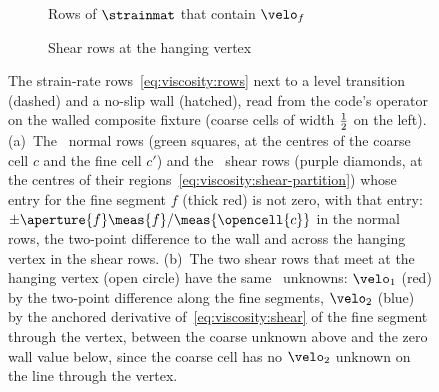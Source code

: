 \begin{figure}
\begin{subfigure}[b]{0.495\textwidth}
    \caption{Rows of $\strainmat$ that contain $\velo_f$}
    \label{fig:viscosity:stencil:rows}
  \end{subfigure}\hfill
  \begin{subfigure}[b]{0.495\textwidth}
    \centering
    \caption{Shear rows at the hanging vertex}
    \label{fig:viscosity:stencil:shear}
  \end{subfigure}
  \caption{The strain-rate rows~\cref{eq:viscosity:rows} next to a level
    transition (dashed) and a no-slip wall (hatched), read from the code's
    operator on the walled composite fixture (coarse cells of width $\frac{1}{2}$
    on the left). (a)~The \chkViscFigNormal\ normal rows (green squares, at
    the centres of the coarse cell $c$ and the fine cell $c'$) and the
    \chkViscFigShear\ shear rows (purple diamonds, at the centres of their
    regions~\cref{eq:viscosity:shear-partition}) whose entry for the fine
    segment $f$ (thick red) is not zero, with that entry:
    $\pm\aperture{f}\meas{f}/\meas{\opencell{c}}$ in the normal rows, the
    two-point difference to the wall and across the hanging vertex in the
    shear rows. (b)~The two shear rows that meet at the hanging vertex (open
    circle) have the same \chkViscFigStencil\ unknowns: $\velo_1$ (red) by the
    two-point difference along the fine segments, $\velo_2$ (blue) by the
    anchored derivative of~\cref{eq:viscosity:shear} of the fine segment
    through the vertex, between the coarse unknown above and the zero wall
    value below, since the coarse cell has no $\velo_2$ unknown on the line
    through the vertex.}
  \label{fig:viscosity:stencil}
\end{figure}
